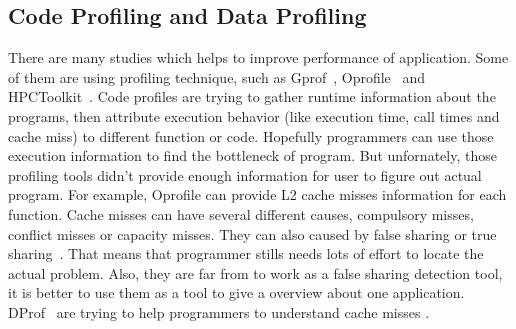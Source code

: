 \label{sec:relatedwork}
\subsection{Code Profiling and Data Profiling}
There are many studies which helps to improve performance of application. Some of them are using profiling technique, such as
Gprof~\cite{gprof}, Oprofile~\cite{oprofile} and HPCToolkit~\cite{HPCToolKit}. Code profiles are trying to gather 
runtime information about the programs, then attribute execution behavior (like execution time, call times and cache miss) to 
different function or code. Hopefully programmers can use those execution information to find the bottleneck of program. 
But unfornately, those profiling tools didn't provide enough information for user to figure out actual program.
For example, Oprofile can provide L2 cache misses information for each function. Cache misses can have several different causes,
compulsory misses, conflict misses or capacity misses. They can also caused by false sharing or true sharing~\cite{DProf}. 
That means that programmer stills needs lots of effort to locate the actual problem. Also,
they are far from to work as a false sharing detection tool, it is better to use them as a tool to give a overview about one application.
DProf~\cite{DProf} are trying to help programmers to understand cache misses .
\begin{comment}
Profiling tools: 
DProf are based on performance monitoring hardware to 
help programmers to locate cache performanmce problems caused by different data types. 
DProf tries to associate memory addresses with data types and use data flow to find the cache problems related to 
the same type of objects. It is not intend to find false sharing problems of general multithreaded applications. 
\begin{itemize}
\item
First, it can not work on randomly data type. The difference of DProf with PTU is that DProf tries 
to attribute cache misses to different data types.
For the problem like Fig.~\ref{fig:reverseindex}, the data types 
are just multiple of integers. It is impossible to profile for this type of data types since there 
are huge amounts of integers in one application.

\item
DProf are trying to provide a ``data flow'' that can help programer to understand data flows from one core to another.
In fact, it is not enough to indentify false sharing problem according to our understanding. For all problems found in
this paper, it didn't existing a data flow bouncing among different cores. 

\item
DProf needs to manual annotation which helps to find data type and fields of one object for one given memory address.

\item
According to their paper, DProf cannot detect false sharing if multiple objects share the same cache line.
 
\end{itemize}
\end{comment}

